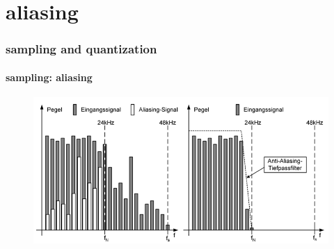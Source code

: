 	\section{aliasing}	
		\begin{frame}\frametitle{sampling and quantization}\framesubtitle{sampling: aliasing}
			\begin{figure}
				\begin{center}
					\includegraphics[scale=0.5]{Graph/aliasing}
				\end{center}
			\end{figure} 
		\end{frame}	

